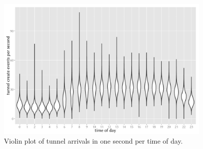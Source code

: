 \documentclass{beamer}
\begin{document}
\begin{frame}
	\begin{figure}
		\centering
		\includegraphics[height=7cm]{../../chapters/04-mobilenets/images/R-createspersecond-1h-violin.pdf}
		\caption{Violin plot of tunnel arrivals in one second per time of day.}
	\end{figure}
\end{frame}
\end{document}
